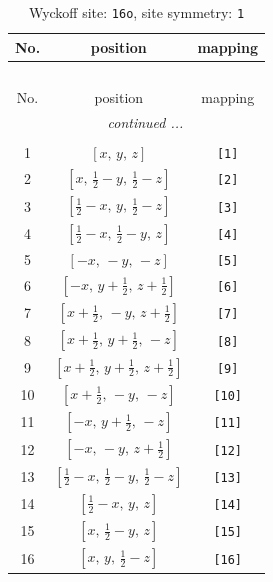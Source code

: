 \documentclass[fleqn,8pt]{jsarticle}
\begin{document}
\begin{longtable}{ccc}
\caption{Wyckoff site: {\tt 16o}, site symmetry: {\tt 1}}
 \\
 \hline \hline
No. & position & mapping \\ \hline \endfirsthead

\multicolumn{2}{l}{\tablename\ \thetable{}} \\
 \hline \hline
No. & position & mapping \\ \hline \endhead

 \hline \hline
\multicolumn{2}{r}{\footnotesize\it continued ...} \\ \endfoot

 \hline \hline
\multicolumn{2}{r}{} \\ \endlastfoot

1 & $\left[ x,\, y,\, z \right]$ & {\tt [1]} \\ \hline
2 & $\left[ x,\, \frac{1}{2} - y,\, \frac{1}{2} - z \right]$ & {\tt [2]} \\ \hline
3 & $\left[ \frac{1}{2} - x,\, y,\, \frac{1}{2} - z \right]$ & {\tt [3]} \\ \hline
4 & $\left[ \frac{1}{2} - x,\, \frac{1}{2} - y,\, z \right]$ & {\tt [4]} \\ \hline
5 & $\left[ - x,\, - y,\, - z \right]$ & {\tt [5]} \\ \hline
6 & $\left[ - x,\, y + \frac{1}{2},\, z + \frac{1}{2} \right]$ & {\tt [6]} \\ \hline
7 & $\left[ x + \frac{1}{2},\, - y,\, z + \frac{1}{2} \right]$ & {\tt [7]} \\ \hline
8 & $\left[ x + \frac{1}{2},\, y + \frac{1}{2},\, - z \right]$ & {\tt [8]} \\ \hline
9 & $\left[ x + \frac{1}{2},\, y + \frac{1}{2},\, z + \frac{1}{2} \right]$ & {\tt [9]} \\ \hline
10 & $\left[ x + \frac{1}{2},\, - y,\, - z \right]$ & {\tt [10]} \\ \hline
11 & $\left[ - x,\, y + \frac{1}{2},\, - z \right]$ & {\tt [11]} \\ \hline
12 & $\left[ - x,\, - y,\, z + \frac{1}{2} \right]$ & {\tt [12]} \\ \hline
13 & $\left[ \frac{1}{2} - x,\, \frac{1}{2} - y,\, \frac{1}{2} - z \right]$ & {\tt [13]} \\ \hline
14 & $\left[ \frac{1}{2} - x,\, y,\, z \right]$ & {\tt [14]} \\ \hline
15 & $\left[ x,\, \frac{1}{2} - y,\, z \right]$ & {\tt [15]} \\ \hline
16 & $\left[ x,\, y,\, \frac{1}{2} - z \right]$ & {\tt [16]} \\
\end{longtable}
\end{document}
